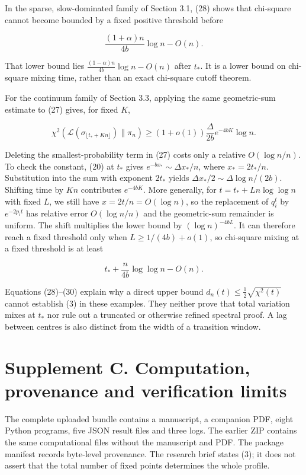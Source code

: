 \documentclass[
  british,
  11pt,
]{article}
\begin{document}
In the sparse, slow-dominated family of Section 3.1, (28) shows that
chi-square cannot become bounded by a fixed positive threshold before

\[\frac{(1+\alpha)n}{4b}\log n-O(n).\]

That lower bound lies \(\frac{(1-\alpha)n}{4b}\log n-O(n)\) after
\(t_*\). It is a lower bound on chi-square mixing time, rather than an
exact chi-square cutoff theorem.

For the continuum family of Section 3.3, applying the same geometric-sum
estimate to (27) gives, for fixed \(K\),

\[
\chi^2(\mathcal L(\sigma_{\lfloor t_*+Kn\rfloor})\|\pi_n)
\ge(1+o(1))\frac{\Delta}{2b}e^{-4bK}\log n. \tag{29}
\]

Deleting the smallest-probability term in (27) costs only a relative
\(O(\log n/n)\). To check the constant, (20) at \(t_*\) gives
\(e^{-bx_*}\sim\Delta x_*/n\), where \(x_*=2t_*/n\). Substitution into
the sum with exponent \(2t_*\) yields
\(\Delta x_*/2\sim\Delta\log n/(2b)\). Shifting time by \(Kn\)
contributes \(e^{-4bK}\). More generally, for \(t=t_*+L n\log\log n\)
with fixed \(L\), we still have \(x=2t/n=O(\log n)\), so the replacement
of \(q_i^t\) by \(e^{-2p_it}\) has relative error \(O(\log n/n)\) and
the geometric-sum remainder is uniform. The shift multiplies the lower
bound by \((\log n)^{-4bL}\). It can therefore reach a fixed threshold
only when \(L\ge1/(4b)+o(1)\), so chi-square mixing at a fixed threshold
is at least

\[t_*+\frac{n}{4b}\log\log n-O( n). \tag{30}\]

Equations (28)--(30) explain why a direct upper bound
\(d_n(t)\le\tfrac12\sqrt{\chi^2(t)}\) cannot establish (3) in these
examples. They neither prove that total variation mixes at \(t_*\) nor
rule out a truncated or otherwise refined spectral proof. A lag between
centres is also distinct from the width of a transition window.

\section{Supplement C. Computation, provenance and verification
limits}\label{supplement-c.-computation-provenance-and-verification-limits}

The complete uploaded bundle contains a manuscript, a companion PDF,
eight Python programs, five JSON result files and three logs. The
earlier ZIP contains the same computational files without the manuscript
and PDF. The package manifest records byte-level provenance. The
research brief states (3); it does not assert that the total number of
fixed points determines the whole profile.
\end{document}
